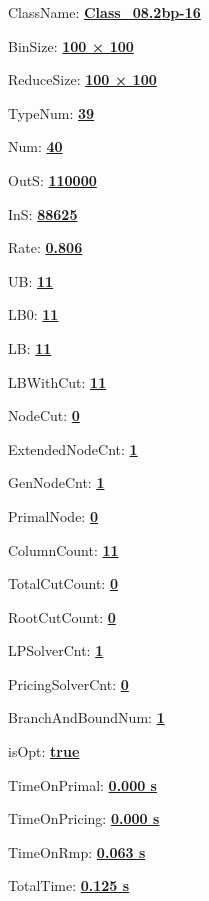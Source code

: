 \documentclass[11pt]{article}
\begin{document}
\pagestyle{empty}


ClassName: \underline{\textbf{Class_08.2bp-16}}
\par
BinSize: \underline{\textbf{100 × 100}}
\par
ReduceSize: \underline{\textbf{100 × 100}}
\par
TypeNum: \underline{\textbf{39}}
\par
Num: \underline{\textbf{40}}
\par
OutS: \underline{\textbf{110000}}
\par
InS: \underline{\textbf{88625}}
\par
Rate: \underline{\textbf{0.806}}
\par
UB: \underline{\textbf{11}}
\par
LB0: \underline{\textbf{11}}
\par
LB: \underline{\textbf{11}}
\par
LBWithCut: \underline{\textbf{11}}
\par
NodeCut: \underline{\textbf{0}}
\par
ExtendedNodeCnt: \underline{\textbf{1}}
\par
GenNodeCnt: \underline{\textbf{1}}
\par
PrimalNode: \underline{\textbf{0}}
\par
ColumnCount: \underline{\textbf{11}}
\par
TotalCutCount: \underline{\textbf{0}}
\par
RootCutCount: \underline{\textbf{0}}
\par
LPSolverCnt: \underline{\textbf{1}}
\par
PricingSolverCnt: \underline{\textbf{0}}
\par
BranchAndBoundNum: \underline{\textbf{1}}
\par
isOpt: \underline{\textbf{true}}
\par
TimeOnPrimal: \underline{\textbf{0.000 s}}
\par
TimeOnPricing: \underline{\textbf{0.000 s}}
\par
TimeOnRmp: \underline{\textbf{0.063 s}}
\par
TotalTime: \underline{\textbf{0.125 s}}
\par
\newpage


\end{document}
